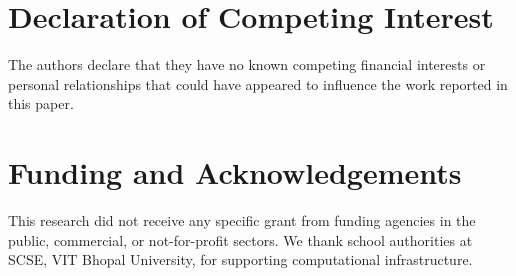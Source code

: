 \documentclass[sn-mathphys,Numbered]{sn-jnl}%
\begin{document}
\begin{backmatter}

\section*{Declaration of Competing Interest}
The authors declare that they have no known competing financial interests or personal relationships that could have appeared to influence the work reported in this paper.

\section*{Funding and Acknowledgements}
This research did not receive any specific grant from funding agencies in the public, commercial, or not-for-profit sectors. We thank school authorities at SCSE, VIT Bhopal University, for supporting computational infrastructure.


\end{backmatter}
\end{document}
